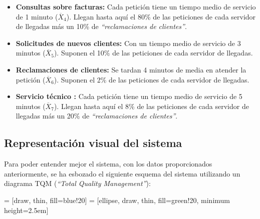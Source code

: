 \begin{itemize}
  \item \textbf{Consultas sobre facturas:} Cada petición tiene un tiempo medio de servicio de 1 minuto ($\overline{X}_{4}$). Llegan hasta aquí el 80\% de las peticiones de cada servidor de llegadas más un 10\% de \emph{``reclamaciones de clientes''}.
  \item \textbf{Solicitudes de nuevos clientes:} Con un tiempo medio de servicio de 3 minutos ($\overline{X}_{5}$). Suponen el 10\% de las peticiones de cada servidor de llegadas.
  \item \textbf{Reclamaciones de clientes:} Se tardan 4 minutos de media en atender la petición ($\overline{X}_{6}$). Suponen el 2\% de las peticiones de cada servidor de llegadas.
  \item \textbf{Servicio técnico :} Cada petición tiene un tiempo medio de servicio de 5 minutos ($\overline{X}_{7}$). Llegan hasta aquí el 8\% de las peticiones de cada servidor de llegadas más un 20\% de \emph{``reclamaciones de clientes''}.
\end{itemize}

\subsection{Representación visual del sistema}
Para poder entender mejor el sistema, con los datos proporcionados anteriormente, se ha esbozado el siguiente esquema del sistema utilizando un diagrama TQM (\emph{``Total Quality Management''}):

 = [draw, thin, fill=blue!20]
 = [ellipse, draw, thin, fill=green!20, minimum height=2.5em]

